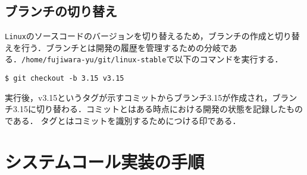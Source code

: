 \documentclass[12pt]{jsarticle}
\begin{document}
\subsection{ブランチの切り替え}
\verb|Linux|のソースコードのバージョンを切り替えるため，ブランチの作成と切り替えを行う．ブランチとは開発の履歴を管理するための分岐である．\verb|/home/fujiwara-yu/git/linux-stable|で以下のコマンドを実行する．
\begin{verbatim}
$ git checkout -b 3.15 v3.15
\end{verbatim}
実行後，v3.15というタグが示すコミットからブランチ3.15が作成され，ブランチ3.15に切り替わる．コミットとはある時点における開発の状態を記録したものである．
タグとはコミットを識別するためにつける印である．

\section{システムコール実装の手順}\label{sec:procedure}
\end{document}
